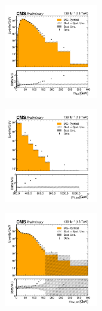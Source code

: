 \begin{figure}[h!]
  \centering
  \begin{subfigure}
    \centering
    \includegraphics[width=0.45\textwidth]{figures/multijet/trijet/mjet_allyears_coarsebin.png}
  \end{subfigure}
  \begin{subfigure}
    \centering
    \includegraphics[width=0.45\textwidth]{figures/multijet/trijet/pt_allyears_coarsebin.png}
  \end{subfigure}
  \begin{subfigure}
    \centering
    \includegraphics[width=0.45\textwidth]{figures/multijet/trijet/msd_allyears_coarsebin.png}
  \end{subfigure}
  \begin{subfigure}
    \centering

\end{subfigure}
\end{figure}
